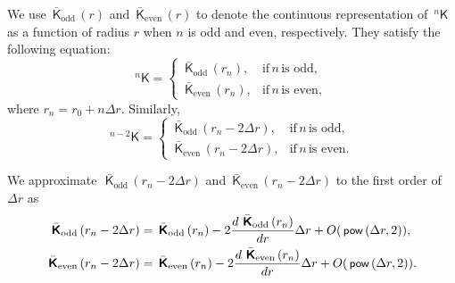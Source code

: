\documentclass[preprint,12pt,times]{elsarticle}
\numberwithin{equation}{section}
\renewcommand{\u}[1]{\boldsymbol{#1}}
\newcommand{\usf}[1]{\u{\mathsf #1}}
\newcommand{\busf}[1]{\bar{\usf{ #1}}}
\newcommand{\pr}[1]{\left( #1 \right)}
\newcommand{\p}{\,\textsf{\small pow}}
\newcommand{\Kodd}{\,\busf{K}_\mathrm{odd} \,}
\newcommand{\Keven}{\,\busf{K}_\mathrm{even} \,}
\renewcommand{\>}{$\Rightarrow$}
\begin{document}
We use $\Kodd (r)$ and $\Keven (r)$ to denote the continuous representation of~${}^{n}{\usf{K}}$ as a function of radius $r$ when $n$ is odd and even, respectively. 
They satisfy the following equation:
\begin{equation}
{}^{n}{\usf{K}} = 
\begin{cases}
\Kodd (r_{n}), & \text{if}\, n\, \text{is odd}, \\
\Keven (r_{n}) , & \text{if}\, n\, \text{is even},
\end{cases}
\label{eq:Kbarn}
\end{equation}
where $r_{n} = r_0 + n \Delta r$.
Similarly,
\begin{equation}
{}^{n-2}{\usf{K}} = 
\begin{cases}
\Kodd \pr{r_{n} - 2 \Delta r}, & \text{if}\, n\, \text{is odd}, \\
\Keven (r_{n} - 2 \Delta r) , & \text{if}\, n\, \text{is even}.
\end{cases}
\label{eq:Kbarnm2}
\end{equation}

We approximate~$\Kodd (r_n - 2 \Delta r)$ and $\Keven (r_n - 2 \Delta r)$ to the first order of~$\Delta r$ as
\begin{subequations}
\begin{align}
\Kodd(r_n - 2 \Delta r) & = \Kodd(r_n) - 2\frac{d\,\Kodd(r_n)}{dr} \Delta r + O(\p\pr{\Delta r,2}), \\
\Keven(r_n - 2 \Delta r) & = \Keven(r_n) - 2\frac{d\,\Keven(r_n)}{dr} \Delta r + O(\p\pr{\Delta r,2}). 
\end{align}
\label{eq:knknm2appr2}
\end{subequations}
\end{document}

